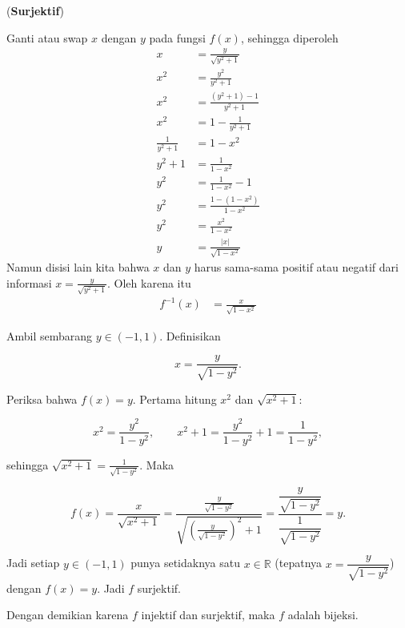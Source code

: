 \documentclass[10pt,openany,a4paper]{article}
\begin{document}
\begin{enumerate}
        (\textbf{Surjektif})
        \begin{tcolorbox}
          Ganti atau swap $x$ dengan $y$ pada fungsi $f(x)$, sehingga diperoleh
          \begin{align*}
            x               & = \frac{y}{\sqrt{y^2+1}}   \\
            x^2             & = \frac{y^2}{y^2+1}        \\
            x^2             & = \frac{(y^2+1)-1}{y^2+1}  \\
            x^2             & = 1-\frac{1}{y^2+1}        \\
            \frac{1}{y^2+1} & = 1-x^2                    \\
            y^2+1           & = \frac{1}{1-x^2}          \\
            y^2             & = \frac{1}{1-x^2}-1        \\
            y^2             & = \frac{1-(1-x^2)}{1-x^2}  \\
            y^2             & = \frac{x^2}{1-x^2}        \\
            y               & = \frac{|x|}{\sqrt{1-x^2}}
          \end{align*}
          Namun disisi lain kita bahwa $x$ dan $y$ harus sama-sama positif atau negatif dari informasi $x= \frac{y}{\sqrt{y^2+1}}$. Oleh karena itu
          \begin{align*}
            f^{-1}(x) & = \frac{x}{\sqrt{1-x^2}}
          \end{align*}
        \end{tcolorbox}

        Ambil sembarang $y\in(-1,1)$. Definisikan

        $$
          x=\frac{y}{\sqrt{1-y^2}}.
        $$

        Periksa bahwa $f(x)=y$. Pertama hitung $x^2$ dan $\sqrt{x^2+1}$:

        $$
          x^2=\frac{y^2}{1-y^2},\qquad x^2+1=\frac{y^2}{1-y^2}+1=\frac{1}{1-y^2},
        $$

        sehingga $\sqrt{x^2+1}=\frac{1}{\sqrt{1-y^2}}$. Maka

        $$
          f(x)=\frac{x}{\sqrt{x^2+1}}=\frac{\frac{y}{\sqrt{1-y^2}}}{\sqrt{\left(\frac{y}{\sqrt{1-y^2}}\right)^2+1}}
          =\frac{\dfrac{y}{\sqrt{1-y^2}}}{\dfrac{1}{\sqrt{1-y^2}}}=y.
        $$

        Jadi setiap $y\in(-1,1)$ punya setidaknya satu $x\in\mathbb{R}$ (tepatnya $x=\dfrac{y}{\sqrt{1-y^2}}$) dengan $f(x)=y$. Jadi $f$ surjektif.

        Dengan demikian karena $f$ injektif dan surjektif, maka $f$ adalah bijeksi.
\end{enumerate}
\end{document}
